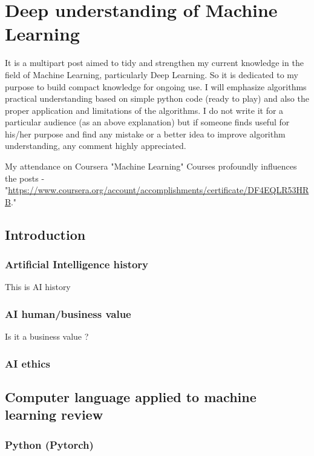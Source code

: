 \documentclass[11pt]{article}
\date{\today}
\title{}
\begin{document}
\tableofcontents

\section{Deep understanding of Machine Learning}
\label{sec:org3771df2}

It is a multipart post aimed to tidy and strengthen my current knowledge in the field of Machine Learning, particularly Deep Learning. So it is dedicated to my purpose to build compact knowledge for ongoing use. I will emphasize algorithms practical understanding based on simple python code (ready to play) and also the proper application and limitations of the algorithms. 
I do not write it for a particular audience (as an above explanation) but if someone finds useful for his/her purpose and find any mistake or a better idea to improve algorithm understanding, any comment highly appreciated.

My attendance on Coursera "Machine Learning" Courses profoundly influences the posts - "\url{https://www.coursera.org/account/accomplishments/certificate/DF4EQLR53HRB}."

\subsection{Introduction}
\label{sec:org8e32d92}
\subsubsection{Artificial Intelligence history}
\label{sec:orga6befb1}
This is AI history
\subsubsection{AI human/business value}
\label{sec:orga9dffdd}
Is it a business value ?
\subsubsection{AI ethics}
\label{sec:org305d6b4}

\subsection{Computer language applied to machine learning review}
\label{sec:orgd69e74d}
\subsubsection{Python (Pytorch)}
\label{sec:orgd4b9220}
\end{document}
